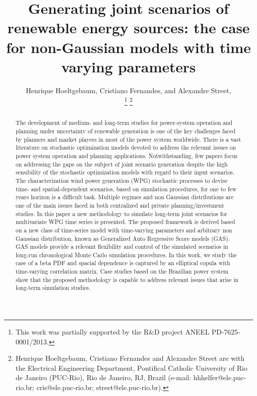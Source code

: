\documentclass[a4paper]{IEEEtran}
\begin{document}
\title{Generating joint scenarios of renewable energy sources: the case for non-Gaussian models with time varying parameters}

\author{Henrique Hoeltgebaum,
	Cristiano Fernandes, and
	Alexandre Street, 
	
	
	\thanks{This work was partially supported by the R\&D project ANEEL PD-7625-0001/2013.}
	\thanks{Henrique Hoeltgebaum, Cristiano Fernandes and Alexandre Street are with the Electrical Engineering Department, Pontifical Catholic University of Rio de Janeiro (PUC-Rio), Rio de Janeiro, RJ, Brazil (e-mail: \mbox{hhhelfer@ele.puc-rio.br}; \mbox{cris@ele.puc-rio.br}; \mbox{street@ele.puc-rio.br}).}
}


\maketitle
\begin{abstract}
	The development of medium- and long-term studies for power-system operation and planning under uncertainty of renewable generation is one of the key challenges faced by planners and market players in most of the power system worldwide. There is a vast literature on stochastic optimization models devoted to address the relevant issues on power system operation and planning applications. Notwithstanding, few papers focus on addressing the gaps on the subject of joint scenario generation despite the high sensibility of the stochastic optimization models with regard to their input scenarios. The characterization wind power generation (WPG) stochastic processes to devise time- and spatial-dependent scenarios, based on simulation procedures, for one to few years horizon is a difficult task. Multiple regimes and non Gaussian distributions are one of the main issues faced in both centralized and private planning/investment studies. In this paper a new methodology to simulate long-term joint scenarios for multivariate WPG time series is presented. The proposed framework is derived based on a new class of time-series model with time-varying parameters and arbitrary non Gaussian distribution, known as Generalized Auto Regressive Score models (GAS). GAS models provide a relevant flexibility and control of the simulated scenarios in long-run chronological Monte Carlo simulation procedures. In this work, we study the case of a beta PDF and spacial dependence is captured by an elliptical copula with time-varying correlation matrix. Case studies based on the Brazilian power system show that the proposed methodology is capable to address relevant issues that arise in long-term simulation studies. 
	
\end{abstract}
\end{document}
